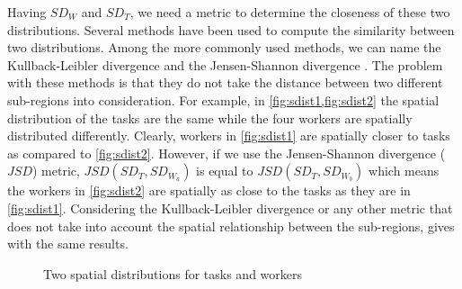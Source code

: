 Having $SD_W$ and $SD_T$, we need a metric to determine the closeness of these two distributions. Several methods have been used to compute the similarity between two distributions. Among the more commonly used methods, we can name the Kullback-Leibler divergence \cite{Kullback51} and the Jensen-Shannon divergence \cite{Lin91}. The problem with these methods is that they do not take the distance between two different sub-regions into consideration. For example, in \cref{fig:sdist1,fig:sdist2} the spatial distribution of the tasks are the same while the four workers are spatially distributed differently. Clearly, workers in \cref{fig:sdist1} are spatially closer to tasks as compared to \cref{fig:sdist2}. However, if we use the  Jensen-Shannon divergence ($JSD$) metric, $JSD(SD_T, SD_{W_a})$ is equal to $JSD(SD_T, SD_{W_b})$ which means the workers in \cref{fig:sdist2} are spatially as close to the tasks as they are in \cref{fig:sdist1}.  Considering the Kullback-Leibler divergence or any other metric that does not take into account the spatial relationship between the sub-regions, gives with the same results.\\

\begin{figure}[t]
    \centering
    \vspace{-0.1in}
    \caption{Two spatial distributions for tasks and workers}
    \label{fig:sdist}
\end{figure}


